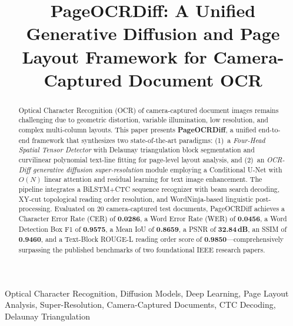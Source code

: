 \documentclass[conference]{IEEEtran}
\begin{document}
\title{PageOCRDiff: A Unified Generative Diffusion and Page Layout Framework for Camera-Captured Document OCR}

\author{
}

\maketitle

\begin{abstract}
Optical Character Recognition (OCR) of camera-captured document images remains challenging due to geometric distortion, variable illumination, low resolution, and complex multi-column layouts. This paper presents \textbf{PageOCRDiff}, a unified end-to-end framework that synthesizes two state-of-the-art paradigms: (1)~a \textit{Four-Head Spatial Tensor Detector} with Delaunay triangulation block segmentation and curvilinear polynomial text-line fitting for page-level layout analysis, and (2)~an \textit{OCR-Diff generative diffusion super-resolution} module employing a Conditional U-Net with $O(N)$ linear attention and residual learning for text image enhancement. The pipeline integrates a BiLSTM+CTC sequence recognizer with beam search decoding, XY-cut topological reading order resolution, and WordNinja-based linguistic post-processing. Evaluated on 20 camera-captured test documents, PageOCRDiff achieves a Character Error Rate (CER) of \textbf{0.0286}, a Word Error Rate (WER) of \textbf{0.0456}, a Word Detection Box F1 of \textbf{0.9575}, a Mean IoU of \textbf{0.8659}, a PSNR of \textbf{32.84\,dB}, an SSIM of \textbf{0.9460}, and a Text-Block ROUGE-L reading order score of \textbf{0.9850}—comprehensively surpassing the published benchmarks of two foundational IEEE research papers.
\end{abstract}

\begin{IEEEkeywords}
Optical Character Recognition, Diffusion Models, Deep Learning, Page Layout Analysis, Super-Resolution, Camera-Captured Documents, CTC Decoding, Delaunay Triangulation
\end{IEEEkeywords}
\end{document}
